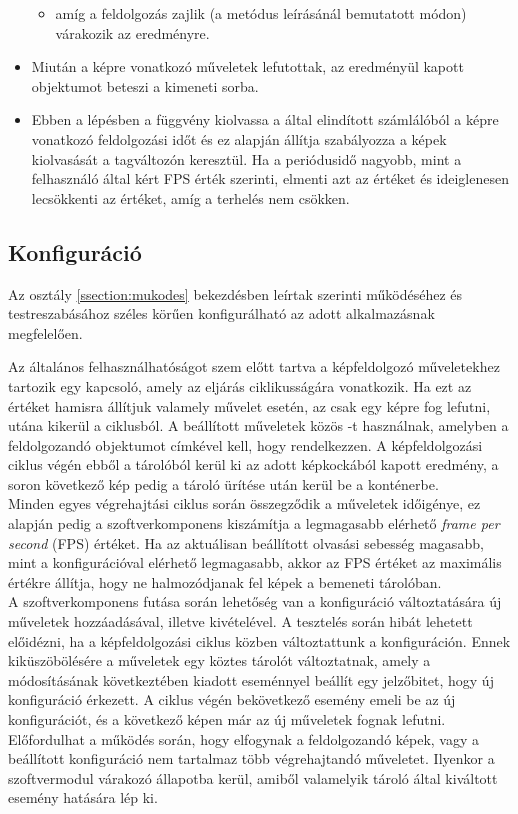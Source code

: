 \begin{itemize}
\begin{itemize}
	\item {} amíg a feldolgozás zajlik (a  metódus leírásánál bemutatott módon) várakozik az eredményre.
\end{itemize}
\item {} Miután a képre vonatkozó műveletek lefutottak, az eredményül kapott  objektumot beteszi a kimeneti sorba.
\item {} Ebben a lépésben a függvény kiolvassa a  által elindított számlálóból a képre vonatkozó feldolgozási időt és ez alapján állítja szabályozza a képek kiolvasását a  tagváltozón keresztül. Ha a periódusidő nagyobb, mint a felhasználó által kért FPS érték szerinti, elmenti azt az értéket és ideiglenesen lecsökkenti az értéket, amíg a terhelés nem csökken. 
\end{itemize}

\subsection{Konfiguráció}

Az osztály \ref{ssection:mukodes} bekezdésben leírtak szerinti működéséhez és testreszabásához széles körűen konfigurálható az adott alkalmazásnak megfelelően.

Az általános felhasználhatóságot szem előtt tartva a képfeldolgozó műveletekhez tartozik egy  kapcsoló, amely az eljárás ciklikusságára vonatkozik. Ha ezt az értéket hamisra állítjuk valamely művelet esetén, az csak egy képre fog lefutni, utána kikerül a ciklusból.
A beállított műveletek közös -t használnak, amelyben a feldolgozandó objektumot  címkével kell, hogy rendelkezzen. A képfeldolgozási ciklus végén ebből a tárolóból kerül ki az adott képkockából kapott eredmény, a soron következő kép pedig a tároló ürítése után kerül be a konténerbe. \\
Minden egyes végrehajtási ciklus során összegződik a műveletek időigénye, ez alapján pedig a szoftverkomponens kiszámítja a legmagasabb elérhető \emph{frame per second} (FPS) értéket. Ha az aktuálisan beállított olvasási sebesség magasabb, mint a konfigurációval elérhető legmagasabb, akkor az FPS értéket az maximális értékre állítja, hogy ne halmozódjanak fel képek a bemeneti tárolóban.\\
A szoftverkomponens futása során lehetőség van a konfiguráció változtatására új műveletek hozzáadásával, illetve kivételével. A tesztelés során hibát lehetett előidézni, ha a képfeldolgozási ciklus közben változtattunk a konfiguráción. Ennek kiküszöbölésére a műveletek egy köztes tárolót változtatnak, amely a módosításának következtében kiadott eseménnyel beállít egy jelzőbitet, hogy új konfiguráció érkezett. A ciklus végén bekövetkező esemény emeli be az új konfigurációt, és a következő képen már az új műveletek fognak lefutni.\\
Előfordulhat a működés során, hogy elfogynak a feldolgozandó képek, vagy a beállított konfiguráció nem tartalmaz több végrehajtandó műveletet. Ilyenkor a szoftvermodul várakozó állapotba kerül, amiből valamelyik tároló által kiváltott esemény hatására lép ki.

